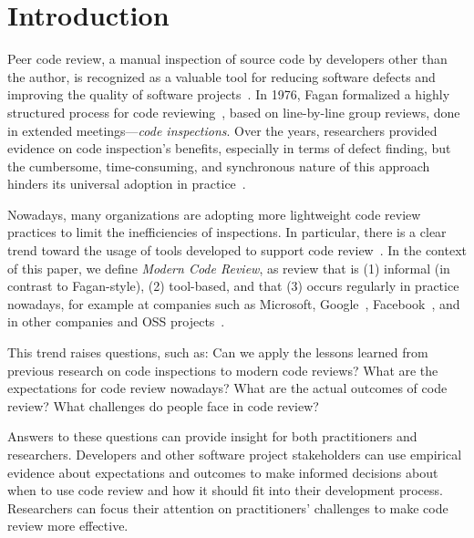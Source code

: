 
\section{Introduction} \label{sec:introduction}


Peer code review, a manual inspection of source code by developers other than
the author, is recognized as a valuable tool for reducing software defects and
improving the quality of software projects~\cite{ackerman1984software, ackerman1989software}.
In 1976, Fagan formalized a highly
structured process for code reviewing~\cite{fagan1976design}, based on line-by-line group
reviews, done in extended meetings---\emph{code inspections}. Over the years,
researchers provided evidence on code inspection's benefits, especially in
terms of defect finding, but the cumbersome, time-consuming, and synchronous
nature of this approach hinders its universal adoption in practice~\cite{shull2008inspecting}. %

Nowadays, many organizations are adopting more lightweight code review
practices to limit the inefficiencies of inspections. In particular, there is a
clear trend toward the usage of tools developed to support code
review~\cite{rigby2012open}. In the context of this paper, we define
\emph{Modern Code Review}, as review that is (1) informal (in contrast to
Fagan-style), (2) tool-based, and that (3) occurs regularly in practice
nowadays, for example at companies such as Microsoft, Google~\cite{kennedy2006online},
Facebook~\cite{tsotsis2011online}, and in other companies and OSS projects~\cite{gerrit2012online}.

This trend raises questions, such as: Can we apply the lessons learned from
previous research on code inspections to modern code reviews? What are the
expectations for code review nowadays? What are the actual outcomes of code
review? What challenges do people face in code review?

Answers to these questions can provide insight for both practitioners and
researchers.  Developers and other software project stakeholders can use
empirical evidence about expectations and outcomes to make informed decisions
about when to use code review and how it should fit into their development
process. Researchers can focus their attention on practitioners' challenges to
make code review more effective.

